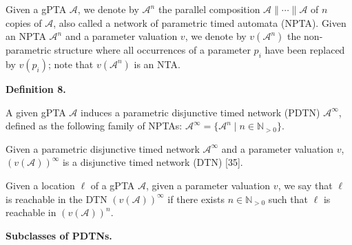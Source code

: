  
 
Given a gPTA $\mathcal{A}$, we denote by ${\mathcal{A}}^{n}$ the parallel composition $\mathcal{A}\parallel\cdots\parallel\mathcal{A}$ of $n$ copies of $\mathcal{A}$, also called a network of parametric timed automata (NPTA). Given an NPTA ${\mathcal{A}}^{n}$ and a parameter valuation $v$, we denote by $v({\mathcal{A}}^{n})$ the non-parametric structure where all occurrences of a parameter $p_{i}$ have been replaced by $v(p_{i})$; note that $v({\mathcal{A}}^{n})$ is an NTA.\par
 
 
 
\par\medskip\noindent\textbf{Definition 8.}\par
 
 
A given gPTA $\mathcal{A}$ induces a parametric disjunctive timed network (PDTN) ${\mathcal{A}}^{\infty}$, defined as the following family of NPTAs: ${\mathcal{A}}^{\infty}=\{{\mathcal{A}}^{n}\mid n\in\mathbb{N}_{>0}\}$.\par
 
 
 
 
Given a parametric disjunctive timed network ${\mathcal{A}}^{\infty}$ and a parameter valuation $v$, ${(v(\mathcal{A}))}^{\infty}$ is a disjunctive timed network (DTN) [35].\par
 
 
 
Given a location $\mathrm{\ell}$ of a gPTA $\mathcal{A}$, given a parameter valuation $v$, we say that $\mathrm{\ell}$ is reachable in the DTN ${(v(\mathcal{A}))}^{\infty}$ if there exists $n\in\mathbb{N}_{>0}$ such that $\mathrm{\ell}$ is reachable in ${(v(\mathcal{A}))}^{n}$.\par
 
 
 
 
\par\medskip\noindent\textbf{Subclasses of PDTNs.}\par
 
